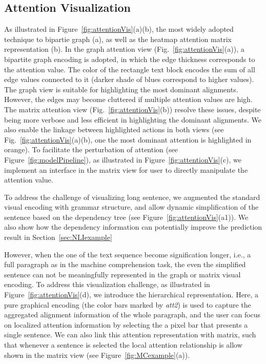 \subsection{Attention Visualization}
As illustrated in Figure~\ref{fig:attentionVis}(a)(b), the most widely adopted technique to bipartie graph (a), as well as the heatmap attention matrix representation (b). 
%
In the graph attention view (Fig.~\ref{fig:attentionVis}(a)), a bipartite graph encoding is adopted, in which the edge thickness corresponds to the attention value. The color of the rectangle text block encodes the sum of all edge values connected to it (darker shade of blues correspond to higher values).
The graph view is suitable for highlighting the most dominant alignments. However, the edges may become cluttered if multiple attention values are high. The matrix attention view (Fig.~\ref{fig:attentionVis}(b)) resolve these issues, despite being more verbose and less efficient in highlighting the dominant alignments. 
We also enable the linkage between highlighted actions in both views (see Fig.~\ref{fig:attentionVis}(a)(b), one the most dominant attention is highlighted in orange).
%
To facilitate the perturbation of attention (see Figure~\ref{fig:modelPipeline}), as illustrated in Figure~\ref{fig:attentionVis}(c), we implement an interface in the matrix view for user to directly manipulate the attention value.

To address the challenge of visualizing long sentence, we augmented the standard visual encoding with grammar structure, and allow dynamic simplification of the sentence based on the dependency tree (see Figure~\ref{fig:attentionVis}(a1)). We also show how the dependency information can potentially improve the prediction result in Section~\ref{sec:NLIexample}

However, when the one of the text sequence become signification longer, i.e., a full paragraph as in the machine comprehension task, the even the simplified sentence can not be meaningfully represented in the graph or matrix visual encoding. To address this visualization challenge, as illustrated in Figure~\ref{fig:attentionVis}(d), we introduce the hierarchical representation. Here, a pure graphical encoding (the color bars marked by \emph{att2}) is used to capture the aggregated alignment information of the whole paragraph, and the user can focus on localized attention information by selecting the a pixel bar that presents a single sentence. We can also link this attention representation with matrix, such that whenever a sentence is selected the local attention relationship is allow shown in the matrix view (see Figure~\ref{fig:MCexample}(a)).

